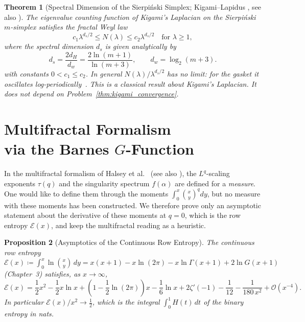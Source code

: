 \documentclass[11pt,a4paper]{article}
\theoremstyle{plain}
\newtheorem{theorem}{Theorem}[section]
\newtheorem{proposition}[theorem]{Proposition}
\theoremstyle{definition}
\theoremstyle{remark}
\numberwithin{equation}{section}
\begin{document}
\begin{theorem}[Spectral Dimension of the Sierpi\'nski Simplex; Kigami--Lapidus \cite{kigamilapidus1993}, see also \cite{kigami2001,rammal1983}]
\label{thm:sierpinski_spectral_dimension}
The eigenvalue counting function of Kigami's Laplacian on the Sierpi\'nski $m$-simplex satisfies the fractal Weyl law
\begin{equation}
c_1 \lambda^{d_s / 2} \le N(\lambda) \le c_2 \lambda^{d_s / 2} \quad \text{for } \lambda \ge 1,
\end{equation}
where the spectral dimension $d_s$ is given analytically by
\begin{equation}
d_s = \frac{2 d_H}{d_w} = \frac{2\ln(m+1)}{\ln(m+3)}, \qquad d_w = \log_2(m+3).
\end{equation}
with constants $0 < c_1 \le c_2$. In general $N(\lambda)/\lambda^{d_s/2}$ has no limit: for the gasket it oscillates log-periodically~\cite{fukushima1992}. This is a classical result about Kigami's Laplacian. It does not depend on Problem~\ref{thm:kigami_convergence}.
\end{theorem}

\section[Multifractal Formalism via Barnes G-Function]{Multifractal Formalism \\ via the Barnes \texorpdfstring{$G$}{G}-Function}

In the multifractal formalism of Halsey et al.\ \cite{halsey1986} (see also \cite{falconer2014}), the $L^q$-scaling exponents $\tau(q)$ and the singularity spectrum $f(\alpha)$ are defined for a \emph{measure}. One would like to define them through the moments $\int_0^x \binom{x}{y}^q dy$, but no measure with these moments has been constructed. We therefore prove only an asymptotic statement about the derivative of these moments at $q = 0$, which is the row entropy $\mathcal{E}(x)$, and keep the multifractal reading as a heuristic.

\begin{proposition}[Asymptotics of the Continuous Row Entropy]
\label{thm:multifractal}
The continuous row entropy $\mathcal{E}(x) \coloneqq \int_0^x \ln\binom{x}{y}\,dy = x(x+1) - x\ln(2\pi) - x\ln\Gamma(x+1) + 2\ln G(x+1)$ (Chapter~3) satisfies, as $x \to \infty$,
\begin{equation}
\mathcal{E}(x) = \frac{1}{2}x^2 - \frac{1}{2}x\ln x + \left(1 - \frac{1}{2}\ln(2\pi)\right)x - \frac{1}{6}\ln x + 2\zeta'(-1) - \frac{1}{12} - \frac{1}{180\,x^2} + \mathcal{O}(x^{-4}).
\end{equation}
In particular $\mathcal{E}(x)/x^2 \to \frac12$, which is the integral $\int_0^1 H(t)\,dt$ of the binary entropy in nats.
\end{proposition}
\end{document}
